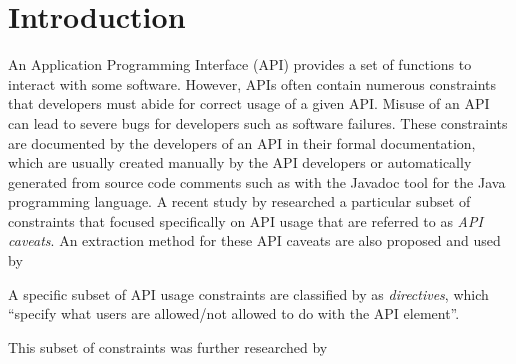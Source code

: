 \chapter{Introduction}
\label{cha:intro}

An Application Programming Interface (API) provides a set of functions to interact with some software. However, APIs often contain numerous constraints that developers must abide for correct usage of a given API. Misuse of an API can lead to severe bugs for developers such as software failures. These constraints are documented by the developers of an API in their formal documentation, which are usually created manually by the API developers or automatically generated from source code comments such as with the Javadoc tool for the Java programming language. A recent study by \citeauthor{caveat-knowledge-graph} researched a particular subset of constraints that focused specifically on API usage that are referred to as \textit{API caveats}. An extraction method for these API caveats are also proposed and used by 

A specific subset of API usage constraints are classified by \cite{maalej2013patterns} as \textit{directives}, which ``specify what users
are allowed/not allowed to do with the API element''. 

This subset of constraints was further researched by \citeauthor{caveat-knowledge-graph}
\\

